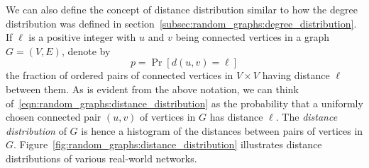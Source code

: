 We can also define the concept of distance distribution similar to how
the degree distribution was defined in
section~\ref{subsec:random_graphs:degree_distribution}. If $\ell$ is a
positive integer with $u$ and $v$ being connected vertices in a graph
$G = (V,E)$, denote by
\begin{equation}
\label{eqn:random_graphs:distance_distribution}
p
=
\Pr[d(u,v) = \ell]
\end{equation}
the fraction of ordered pairs of connected vertices in $V \times V$
having distance $\ell$ between them. As is evident from the above
notation, we can think
of~\eqref{eqn:random_graphs:distance_distribution} as the probability
that a uniformly chosen connected pair $(u,v)$ of vertices in $G$ has
distance $\ell$. The
\emph{distance distribution} of $G$ is
hence a histogram of the distances between pairs of vertices in
$G$. Figure~\ref{fig:random_graphs:distance_distribution} illustrates
distance distributions of various real-world networks.


